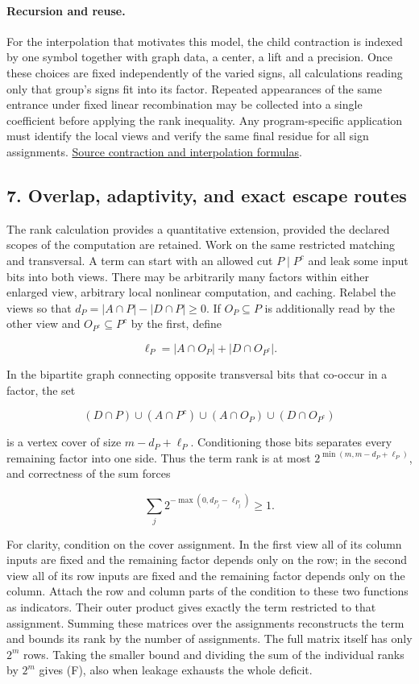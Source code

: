 \documentclass[
  11pt,
]{article}
\begin{document}
\paragraph{Recursion and reuse.}
For the interpolation that motivates this model, the child contraction
is indexed by one symbol together with graph data, a center, a lift and
a precision. Once these choices are fixed independently of the varied
signs, all calculations reading only that group's signs fit into its
factor. Repeated appearances of the same entrance under fixed linear
recombination may be collected into a single coefficient before applying
the rank inequality. Any program-specific application must identify the
local views and verify the same final residue for all sign assignments.
\href{https://github.com/openai/math/blob/main/preprints/The-Exponential-Time-Hypothesis-is-False-October-25-2026/build/quantitative-contraction.tex}{Source contraction and interpolation formulas}.

\subsection{7. Overlap, adaptivity, and exact escape
routes}\label{overlap-adaptivity-and-exact-escape-routes}

The rank calculation provides a quantitative extension, provided the
declared scopes of the computation are retained. Work on the same
restricted matching and transversal. A term can start with an allowed
cut \(P\mid P^c\) and leak some input bits into both views. There may be
arbitrarily many factors within either enlarged view, arbitrary local
nonlinear computation, and caching. Relabel the views so that
\(d_P=|A\cap P|-|D\cap P|\ge0\). If \(O_P\subseteq P\) is additionally
read by the other view and \(O_{P^c}\subseteq P^c\) by the first, define

\[
\ell_P=|A\cap O_P|+|D\cap O_{P^c}|.
\]

In the bipartite graph connecting opposite transversal bits that
co-occur in a factor, the set

\[
(D\cap P)\cup(A\cap P^c)\cup(A\cap O_P)\cup(D\cap O_{P^c})
\]

is a vertex cover of size \(m-d_P+\ell_P\). Conditioning those bits
separates every remaining factor into one side. Thus the term rank is at
most \(2^{\min(m,m-d_P+\ell_P)}\), and correctness of the sum forces

\[
\sum_j2^{-\max(0,d_{P_j}-\ell_{P_j})}\ge1.
\tag{F}
\]

For clarity, condition on the cover assignment. In the first view all
of its column inputs are fixed and the remaining factor depends only
on the row; in the second view all of its row inputs are fixed and the
remaining factor depends only on the column. Attach the row and column
parts of the condition to these two functions as indicators. Their outer
product gives exactly the term restricted to that assignment. Summing
these matrices over the assignments reconstructs the term and bounds
its rank by the number of assignments. The full matrix itself has only
\(2^m\) rows. Taking the smaller bound and dividing the sum of the
individual ranks by \(2^m\) gives (F), also when leakage exhausts the
whole deficit.
\end{document}
